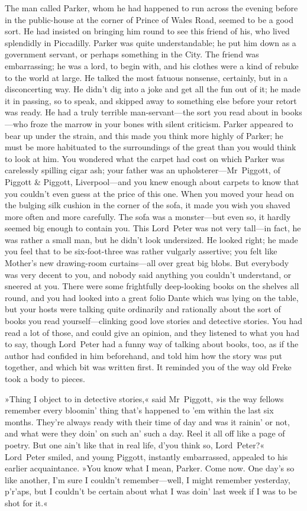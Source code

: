 The man called Parker, whom he had happened to run across the evening before in the public-house at the corner of Prince of Wales Road, seemed to be a good sort. He had insisted on bringing him round to see this friend of his, who lived splendidly in Piccadilly. Parker was quite understandable; he put him down as a government servant, or perhaps something in the City. The friend was embarrassing; he was a lord, to begin with, and his clothes were a kind of rebuke to the world at large. He talked the most fatuous nonsense, certainly, but in a disconcerting way. He didn't dig into a joke and get all the fun out of it; he made it in passing, so to speak, and skipped away to something else before your retort was ready. He had a truly terrible man-servant—the sort you read about in books—who froze the marrow in your bones with silent criticism. Parker appeared to bear up under the strain, and this made you think more highly of Parker; he must be more habituated to the surroundings of the great than you would think to look at him. You wondered what the carpet had cost on which Parker was carelessly spilling cigar ash; your father was an upholsterer—Mr~Piggott, of Piggott \& Piggott, Liverpool—and you knew enough about carpets to know that you couldn't even guess at the price of this one. When you moved your head on the bulging silk cushion in the corner of the sofa, it made you wish you shaved more often and more carefully. The sofa was a monster—but even so, it hardly seemed big enough to contain you. This Lord~Peter was not very tall—in fact, he was rather a small man, but he didn't look undersized. He looked right; he made you feel that to be six-foot-three was rather vulgarly assertive; you felt like Mother's new drawing-room curtains—all over great big blobs. But everybody was very decent to you, and nobody said anything you couldn't understand, or sneered at you. There were some frightfully deep-looking books on the shelves all round, and you had looked into a great folio Dante which was lying on the table, but your hosts were talking quite ordinarily and rationally about the sort of books you read yourself—clinking good love stories and detective stories. You had read a lot of those, and could give an opinion, and they listened to what you had to say, though Lord~Peter had a funny way of talking about books, too, as if the author had confided in him beforehand, and told him how the story was put together, and which bit was written first. It reminded you of the way old Freke took a body to pieces.

»Thing I object to in detective stories,« said Mr~Piggott, »is the way fellows remember every bloomin' thing that's happened to 'em within the last six months. They're always ready with their time of day and was it rainin' or not, and what were they doin' on such an' such a day. Reel it all off like a page of poetry. But one ain't like that in real life, d'you think so, Lord~Peter?« Lord~Peter smiled, and young Piggott, instantly embarrassed, appealed to his earlier acquaintance. »You know what I mean, Parker. Come now. One day's so like another, I'm sure I couldn't remember—well, I might remember yesterday, p'r'aps, but I couldn't be certain about what I was doin' last week if I was to be shot for it.«

